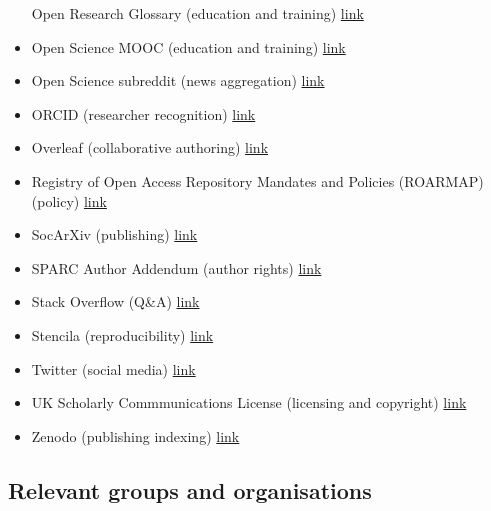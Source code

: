 \begin{itemize}
  Open Research Glossary (education and training)
  \href{http://www.righttoresearch.org/resources/openresearchglossary/}{link}
\item
  Open Science MOOC (education and training)
  \href{https://eliademy.com/opensciencemooc}{link}
\item
  Open Science subreddit (news aggregation)
  \href{https://www.reddit.com/r/Open_Science/}{link}
\item
  ORCID (researcher recognition) \href{https://orcid.org/}{link}
\item
  Overleaf (collaborative authoring)
  \href{https://www.overleaf.com/}{link}
\item
  Registry of Open Access Repository Mandates and Policies (ROARMAP)
  (policy) \href{https://roarmap.eprints.org/cgi/search/advanced}{link}
\item
  SocArXiv (publishing) \href{https://osf.io/preprints/socarxiv/}{link}
\item
  SPARC Author Addendum (author rights)
  \href{https://sparcopen.org/our-work/author-rights/brochure-html/}{link}
\item
  Stack Overflow (Q\&A) \href{https://stackoverflow.com/}{link}
\item
  Stencila (reproducibility) \href{https://stenci.la/}{link}
\item
  Twitter (social media) \href{https://twitter.com/}{link}
\item
  UK Scholarly Commmunications License (licensing and copyright)
  \href{http://ukscl.ac.uk/}{link}
\item
  Zenodo (publishing indexing) \href{https://zenodo.org/}{link}
\end{itemize}

\subsection{Relevant groups and
organisations}\label{relevant-groups-and-organisations}

